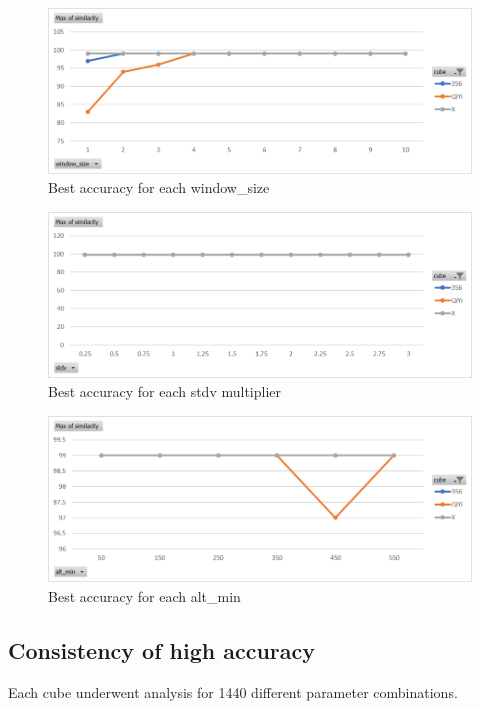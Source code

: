 \begin{figure}[h]
    \centering
    \caption{Best accuracy for each window\_size}
    \label{fig:max-similarity-by-window-size}
    \includegraphics[width=0.75\linewidth]{Figures/7 Evaluation/max_similarity_by_window_size.png}
\end{figure}

\begin{figure}[h]
    \centering
    \caption{Best accuracy for each stdv multiplier}
    \label{fig:max-similarity-by-stdv}
    \includegraphics[width=0.75\linewidth]{Figures/7 Evaluation/max_similarity_by_stdv.png}
\end{figure}

\begin{figure}[h]
    \centering
    \caption{Best accuracy for each alt\_min}
    \label{fig:max-similarity-by-alt-min}
    \includegraphics[width=0.75\linewidth]{Figures/7 Evaluation/max_similarity_by_alt_min.png}
\end{figure}

\subsection{Consistency of high accuracy}
Each cube underwent analysis for 1440 different parameter combinations.

